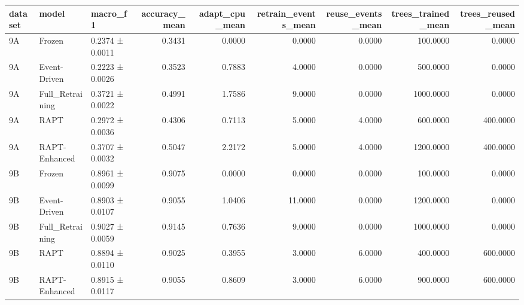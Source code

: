 \begin{tabular}{lllrrrrrr}
\toprule
dataset & model & macro_f1 & accuracy_mean & adapt_cpu_mean & retrain_events_mean & reuse_events_mean & trees_trained_mean & trees_reused_mean \\
\midrule
9A & Frozen & 0.2374 ± 0.0011 & 0.3431 & 0.0000 & 0.0000 & 0.0000 & 100.0000 & 0.0000 \\
9A & Event-Driven & 0.2223 ± 0.0026 & 0.3523 & 0.7883 & 4.0000 & 0.0000 & 500.0000 & 0.0000 \\
9A & Full_Retraining & 0.3721 ± 0.0022 & 0.4991 & 1.7586 & 9.0000 & 0.0000 & 1000.0000 & 0.0000 \\
9A & RAPT & 0.2972 ± 0.0036 & 0.4306 & 0.7113 & 5.0000 & 4.0000 & 600.0000 & 400.0000 \\
9A & RAPT-Enhanced & 0.3707 ± 0.0032 & 0.5047 & 2.2172 & 5.0000 & 4.0000 & 1200.0000 & 400.0000 \\
9B & Frozen & 0.8961 ± 0.0099 & 0.9075 & 0.0000 & 0.0000 & 0.0000 & 100.0000 & 0.0000 \\
9B & Event-Driven & 0.8903 ± 0.0107 & 0.9055 & 1.0406 & 11.0000 & 0.0000 & 1200.0000 & 0.0000 \\
9B & Full_Retraining & 0.9027 ± 0.0059 & 0.9145 & 0.7636 & 9.0000 & 0.0000 & 1000.0000 & 0.0000 \\
9B & RAPT & 0.8894 ± 0.0110 & 0.9025 & 0.3955 & 3.0000 & 6.0000 & 400.0000 & 600.0000 \\
9B & RAPT-Enhanced & 0.8915 ± 0.0117 & 0.9055 & 0.8609 & 3.0000 & 6.0000 & 900.0000 & 600.0000 \\
\bottomrule
\end{tabular}
